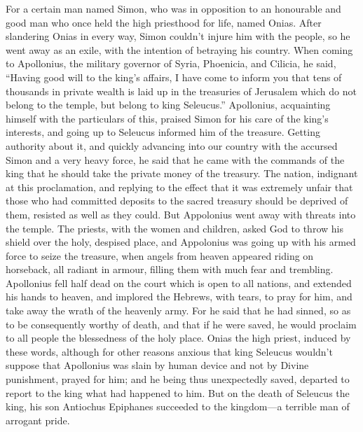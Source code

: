  For a certain man named Simon, who was in opposition to an
honourable and good man who once held the high priesthood for life,
named Onias. After slandering Onias in every way, Simon couldn't injure
him with the people, so he went away as an exile, with the intention of
betraying his country.  When coming to Apollonius, the
military governor of Syria, Phoenicia, and Cilicia, he said,
 ``Having good will to the king's affairs, I have come to
inform you that tens of thousands in private wealth is laid up in the
treasuries of Jerusalem which do not belong to the temple, but belong to
king Seleucus.''  Apollonius, acquainting himself with the
particulars of this, praised Simon for his care of the king's interests,
and going up to Seleucus informed him of the treasure. 
Getting authority about it, and quickly advancing into our country with
the accursed Simon and a very heavy force,  he said that he
came with the commands of the king that he should take the private money
of the treasury.  The nation, indignant at this
proclamation, and replying to the effect that it was extremely unfair
that those who had committed deposits to the sacred treasury should be
deprived of them, resisted as well as they could.  But
Appolonius went away with threats into the temple.  The
priests, with the women and children, asked God to throw his shield over
the holy, despised place,  and Appolonius was going up with
his armed force to seize the treasure, when angels from heaven appeared
riding on horseback, all radiant in armour, filling them with much fear
and trembling.  Apollonius fell half dead on the court
which is open to all nations, and extended his hands to heaven, and
implored the Hebrews, with tears, to pray for him, and take away the
wrath of the heavenly army.  For he said that he had
sinned, so as to be consequently worthy of death, and that if he were
saved, he would proclaim to all people the blessedness of the holy
place.  Onias the high priest, induced by these words,
although for other reasons anxious that king Seleucus wouldn't suppose
that Apollonius was slain by human device and not by Divine punishment,
prayed for him;  and he being thus unexpectedly saved,
departed to report to the king what had happened to him. 
But on the death of Seleucus the king, his son Antiochus Epiphanes
succeeded to the kingdom---a terrible man of arrogant pride.

